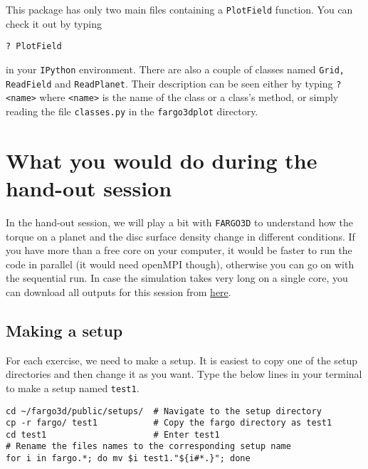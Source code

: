 \documentclass[14pt]{scrartcl}
\begin{document}
This package has only two main files containing a \texttt{PlotField} function. You can check it out by typing 
\begin{verbatim}
? PlotField
\end{verbatim}
in your \texttt{IPython} environment. There are also a couple of classes named \texttt{Grid, ReadField} and \texttt{ReadPlanet}. Their description can be seen either by typing  \texttt{? <name>} where \verb!<name>! is the name of the class or a class's method, or simply reading the file \texttt{classes.py} in the \texttt{fargo3dplot} directory. 


\section{What you would do during the hand-out session} \label{sec:during}
In the hand-out session, we will play a bit with \texttt{FARGO3D} to understand how the torque on a planet and the disc surface density change in different conditions. If you have more than a free core on your computer, it would be faster to run the code in parallel (it would need openMPI though), otherwise you can go on with the sequential run. In case the simulation takes very long on a single core, you can download all outputs for this session from \href{https://fumdrive.um.ac.ir/index.php/s/ac6t3bdYtZZqjTi}{here}. 

\subsection{Making a setup} \label{subsec:setup}
For each exercise, we need to make a setup. It is easiest to copy one of the setup directories and then change it as you want. Type the below lines in your terminal to make a setup named \texttt{test1}.
\begin{verbatim}
cd ~/fargo3d/public/setups/  # Navigate to the setup directory
cp -r fargo/ test1           # Copy the fargo directory as test1
cd test1                     # Enter test1
# Rename the files names to the corresponding setup name
for i in fargo.*; do mv $i test1."${i#*.}"; done  
\end{verbatim}
\end{document}
